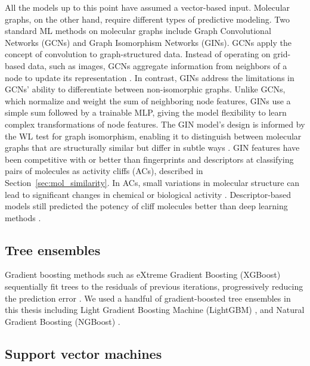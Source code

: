 All the models up to this point have assumed a vector-based input. Molecular graphs, on the other hand, require different types of predictive modeling. Two standard ML methods on molecular graphs include Graph Convolutional Networks (GCNs) and Graph Isomorphism Networks (GINs). GCNs apply the concept of convolution to graph-structured data. Instead of operating on grid-based data, such as images, GCNs aggregate information from neighbors of a node to update its representation \citep{Kipf2017}. In contrast, GINs address the limitations in GCNs’ ability to differentiate between non-isomorphic graphs. Unlike GCNs, which normalize and weight the sum of neighboring node features, GINs use a simple sum followed by a trainable MLP, giving the model flexibility to learn complex transformations of node features. The GIN model’s design is informed by the WL test for graph isomorphism, enabling it to distinguish between molecular graphs that are structurally similar but differ in subtle ways \citep{TeachOpenCADD2023, Xu2019}. GIN features have been competitive with or better than fingerprints and descriptors at classifying pairs of molecules as activity cliffs (ACs), described in Section~\ref{sec:mol_similarity}. In ACs, small variations in molecular structure can lead to significant changes in chemical or biological activity \citep{Dablander2023}. Descriptor-based models still predicted the potency of cliff molecules better than deep learning methods \citep{vanTilborg2022}. 

\subsection{Tree ensembles}

Gradient boosting methods such as eXtreme Gradient Boosting (XGBoost) sequentially fit trees to the residuals of previous iterations, progressively reducing the prediction error \citep{Chen2016, Mustapha2016, Tian2022}. We used a handful of gradient-boosted tree ensembles in this thesis including Light Gradient Boosting Machine (LightGBM) \citep{ke2017lightgbm}, and Natural Gradient Boosting (NGBoost) \citep{Duan2020}.

\subsection{Support vector machines}


